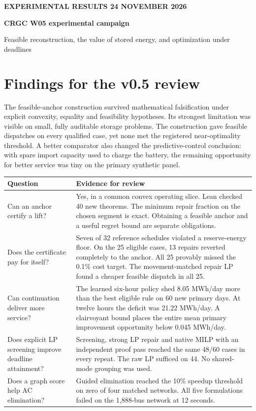 \documentclass[10pt,letterpaper]{article}
\newcommand{\sect}[1]{\section*{\color{ink}#1}}
\begin{document}
{\small\bfseries\color{green} EXPERIMENTAL RESULTS \hfill 24 NOVEMBER 2026}\par
{\LARGE\bfseries\color{ink} CRGC W05 experimental campaign}\par
{\large Feasible reconstruction, the value of stored energy, and optimization under deadlines}\par
\sect{Findings for the v0.5 review}
The feasible-anchor construction survived mathematical falsification under explicit convexity, equality and feasibility hypotheses. Its strongest limitation was visible on small, fully auditable storage problems. The construction gave feasible dispatches on every qualified case, yet none met the registered near-optimality threshold. A better comparator also changed the predictive-control conclusion: with spare import capacity used to charge the battery, the remaining opportunity for better service was tiny on the primary synthetic panel.

\begin{tabularx}{\linewidth}{@{}>{\raggedright\arraybackslash}p{1.12in}>{\raggedright\arraybackslash}X@{}}
\toprule
Question & Evidence for review\\\midrule
Can an anchor certify a lift? &
Yes, in a common convex operating slice. Lean checked 40 new theorems. The minimum repair fraction on the chosen segment is exact. Obtaining a feasible anchor and a useful regret bound are separate obligations.\\[3pt]
Does the certificate pay for itself? &
Seven of 32 reference schedules violated a reserve-energy floor. On the 25 eligible cases, 13 repairs reverted completely to the anchor. All 25 provably missed the 0.1\% cost target. The movement-matched repair LP found a cheaper feasible dispatch in all 25.\\[3pt]
Can continuation deliver more service? &
The learned six-hour policy shed 8.05 MWh/day more than the best eligible rule on 60 new primary days. At twelve hours the deficit was 21.22 MWh/day. A clairvoyant bound places the entire mean primary improvement opportunity below 0.045 MWh/day.\\[3pt]
Does explicit LP screening improve deadline attainment? &
Screening, strong LP repair and native MILP with an independent proof pass reached the same 48/60 cases in every repeat. The raw LP sufficed on 44. No shared-mode grouping was used.\\[3pt]
Does a graph score help AC elimination? &
Guided elimination reached the 10\% speedup threshold on zero of four matched networks. All five formulations failed on the 1,888-bus network at 12 seconds.\\\bottomrule
\end{tabularx}
\end{document}
